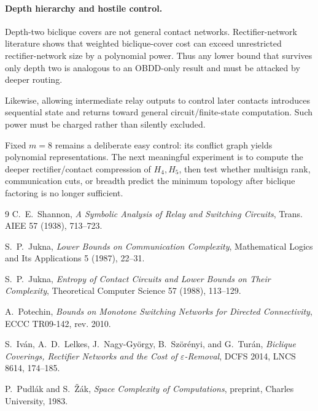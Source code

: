 \paragraph{Depth hierarchy and hostile control.}
Depth-two biclique covers are not general contact networks. Rectifier-network literature
shows that weighted biclique-cover cost can exceed unrestricted rectifier-network size by
a polynomial power. Thus any lower bound that survives only depth two is analogous to an
OBDD-only result and must be attacked by deeper routing.

Likewise, allowing intermediate relay outputs to control later contacts introduces sequential
state and returns toward general circuit/finite-state computation. Such power must be charged
rather than silently excluded.

Fixed \(m=8\) remains a deliberate easy control: its conflict graph yields polynomial
representations. The next meaningful experiment is to compute the deeper rectifier/contact
compression of \(H_4,H_5\), then test whether multisign rank, communication cuts, or
breadth predict the minimum topology after biclique factoring is no longer sufficient.

\begin{thebibliography}{9}
C.~E.~Shannon,
\emph{A Symbolic Analysis of Relay and Switching Circuits},
Trans. AIEE 57 (1938), 713--723.

S.~P.~Jukna,
\emph{Lower Bounds on Communication Complexity},
Mathematical Logics and Its Applications 5 (1987), 22--31.

S.~P.~Jukna,
\emph{Entropy of Contact Circuits and Lower Bounds on Their Complexity},
Theoretical Computer Science 57 (1988), 113--129.

A.~Potechin,
\emph{Bounds on Monotone Switching Networks for Directed Connectivity},
ECCC TR09-142, rev. 2010.

S.~Iv\'an, A.~D.~Lelkes, J.~Nagy-Gy\"orgy, B.~Sz\"or\'enyi, and G.~Tur\'an,
\emph{Biclique Coverings, Rectifier Networks and the Cost of $\varepsilon$-Removal},
DCFS 2014, LNCS 8614, 174--185.

P.~Pudl\'ak and S.~\v{Z}\'ak,
\emph{Space Complexity of Computations},
preprint, Charles University, 1983.
\end{thebibliography}

